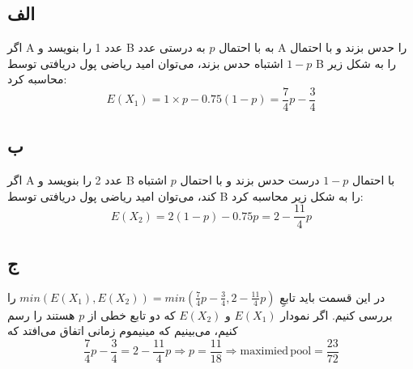 
\subsection*{الف}
اگر A عدد 1 را بنویسد و B به با احتمال $p$ به درستی عدد A را حدس بزند و با احتمال $1-p$ اشتباه حدس بزند، می‌توان امید ریاضی پول دریافتی توسط B را به شکل زیر محاسبه کرد:
$$
E(X_1) = 1\times p - 0.75(1 - p) = \frac{7}{4}p - \frac{3}{4}
$$


\subsection*{ب}
اگر A عدد 2 را بنویسد و B با احتمال $1-p$ درست حدس بزند و با احتمال $p$ اشتباه کند، می‌توان امید ریاضی پول دریافتی توسط B را به شکل زیر محاسبه کرد:
$$
E(X_2) = 2(1-p) - 0.75p = 2 - \frac{11}{4}p
$$

\subsection*{ج}
در این قسمت باید تابعِ
$
min(E(X_1), E(X_2)) = min(\frac{7}{4}p - \frac{3}{4}, 2 - \frac{11}{4}p)
$
را بررسی کنیم. اگر نمودار $E(X_1)$ و $E(X_2)$ که دو تابع خطی از $p$ هستند را رسم کنیم، می‌بینیم که مینیموم زمانی اتفاق می‌افتد که 
$$
\frac{7}{4}p - \frac{3}{4} = 2 - \frac{11}{4}p \Rightarrow p = \frac{11}{18} \Rightarrow \mathrm{maximied\,pool} = \frac{23}{72}
$$